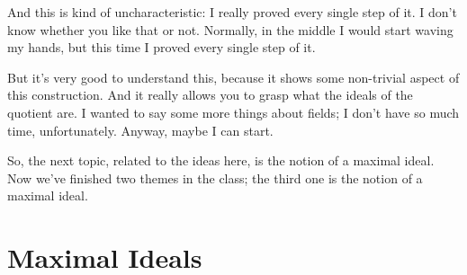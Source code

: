 \begin{hidden}
\end{hidden}

\begin{speech}[00:36:36 - 00:37:56]
And this is kind of uncharacteristic: I really proved every single step of it. I don't know whether you like that or not. Normally, in the middle I would start waving my hands, but this time I proved every single step of it.

But it's very good to understand this, because it shows some non-trivial aspect of this construction. And it really allows you to grasp what the ideals of the quotient are. I wanted to say some more things about fields; I don't have so much time, unfortunately. Anyway, maybe I can start.

So, the next topic, related to the ideas here, is the notion of a maximal ideal. Now we've finished two themes in the class; the third one is the notion of a maximal ideal.
\end{speech}

\section{Maximal Ideals}

